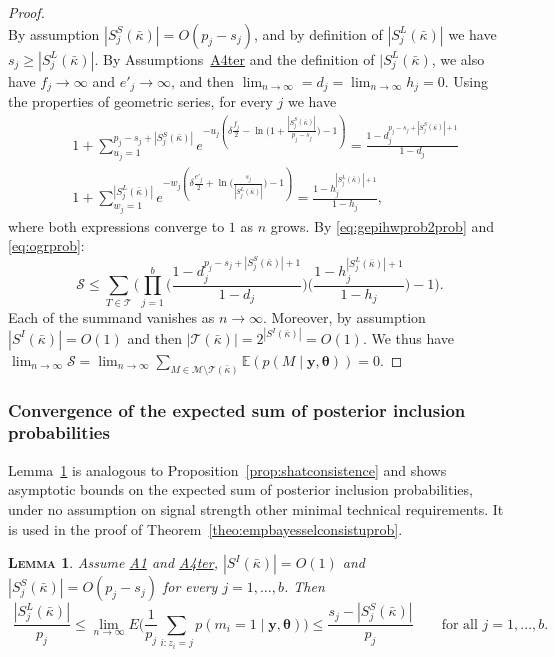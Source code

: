 \documentclass[
  12pt]{article}
\newcommand{\E}{\mathbb{E}}
\newcommand{\M}{\mathcal{M}}
\newcommand{\T}{\mathcal{T}}
\newcommand{\by}{\mathbf{y}}
\newcommand{\btheta}{\boldsymbol{\theta}}
\newtheorem{lem}[thm]{\textsc{Lemma}}
\begin{document}
\begin{proof}
$$$$
By assumption $|S^{S}_j(\bar{\kappa})|=O(p_j-s_j)$, and by definition of $|S_j^{L}(\bar{\kappa})|$ we have $s_j\geq|S_j^{L}(\bar{\kappa})|$. By Assumptions~\hyperlink{lab:A4ter}{A4ter} and the definition of $|S_j^{L}(\bar{\kappa})$, we also have $f_j\to\infty$ and $e'_j\to\infty$, and then $\lim_{n \to \infty}= d_j= \lim_{n \to \infty} h_j=0$. Using the properties of geometric series, 
 for every $j$ we have
\begin{eqnarray*}
    &1+\sum_{u_j=1}^{p_j-s_j+|S_j^{S}(\bar{\kappa})|}e^{-u_j\left(\delta \tfrac{f_j}{2}-\ln\big(1+\frac{|S^{S}_j(\bar{\kappa})|}{p_j-s_j}\big)-1\right)}
    =\frac{1-d_j^{p_j-s_j+|S_j^{S}(\bar{\kappa})|+1}}{1-d_j} \\
    &1+\sum_{w_j=1}^{|S_j^{L}(\bar{\kappa})|}    e^{-w_j\left(\delta \tfrac{e'_j}{2}+\ln\big(\frac{s_j}{|S_j^{L}(\bar{\kappa})|}\big)-1\right)} =\frac{1-h_j^{|S_j^{L}(\bar{\kappa})|+1}}{1-h_j},
\end{eqnarray*}
where both expressions converge to $1$ as $n$ grows. By \eqref{eq:gepihwprob2prob} and \eqref{eq:ogrprob}:
$$\mathcal{S}\leq\sum_{T\in\T}\Bigg(\prod_{j=1}^b\Big(\frac{1-d_j^{p_j-s_j+|S_j^{S}(\bar{\kappa})|+1}}{1-d_j}\Big)\Big(\frac{1-h_j^{|S_j^{L}(\bar{\kappa})|+1}}{1-h_j}\Big)-1\Bigg).$$
Each of the summand vanishes as $n\to\infty$. Moreover, by assumption $|S^I(\bar{\kappa})|=O(1)$ and then $|\T(\bar{\kappa})|=2^{|S^I(\bar{\kappa})|}=O(1)$. We thus have $\lim_{n\to\infty}\mathcal{S}=\lim_{n\to\infty}\sum_{M \in \M\setminus \T(\bar{\kappa})} \E\left(p(M\mid \by, \btheta)\right)=0$.
\end{proof}

\subsubsection{Convergence of the expected sum of posterior inclusion probabilities}
Lemma~\ref{prop:shatconsistenceprob} is analogous to Proposition~\ref{prop:shatconsistence} and shows asymptotic bounds on the expected sum of posterior inclusion probabilities, under no assumption on signal strength other minimal technical requirements. It is used in the proof of Theorem~\ref{theo:empbayesselconsistuprob}.
\begin{lem}
    \label{prop:shatconsistenceprob}
Assume \hyperlink{lab:A1}{A1} and \hyperlink{lab:A4ter}{A4ter}, $|S^{I}(\bar{\kappa})|=O(1)$ and $|S^{S}_j(\bar{\kappa})|=O(p_j-s_j)$ for every $j=1,\ldots,b$. Then
$$ \,\, \frac{|S^{L}_j(\bar{\kappa})|}{p_j}\leq \lim_{n\to\infty}E\bigg(\frac{1}{p_j}\sum_{i:z_i=j} p(m_i=1 \mid \by, \btheta)\bigg)\leq \frac{s_j-|S^{S}_j(\bar{\kappa})|}{p_j}\qquad\text{for all }j=1,\ldots,b.$$
\end{lem}
\end{document}
